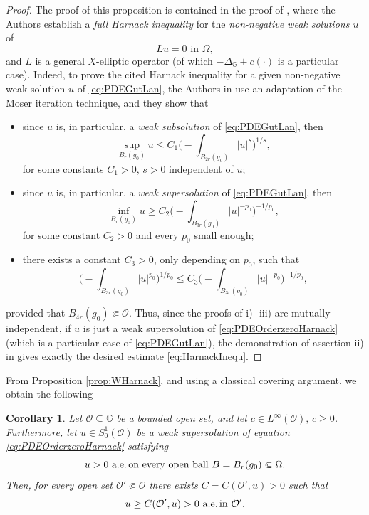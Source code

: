 \documentclass[11pt]{amsart}
\numberwithin{equation}{section} %
\newtheorem{coro}[teo]{Corollary}
\theoremstyle{definition}
\def\Oo{\mathcal O}
\begin{document}
\begin{proof}
 The proof of this proposition is contained in the proof of \cite[Theorem 4.1]{GutLan},
 where the Authors establish a \emph{full Harnack inequality}
 for the \emph{non-negative weak solutions $u$} of 
 \begin{equation} \label{eq:PDEGutLan} 
  \text{$Lu = 0$ in $\Omega$},
 \end{equation}
 and $L$ is a general $X$-elliptic operator (of which $-\Delta_\mathbb{G}+c(\cdot)$ is a particular
 case).
 Indeed,
 to prove the cited Harnack inequality for a given non-negative weak solution $u$
 of \eqref{eq:PDEGutLan}, the Authors in \cite{GutLan} use
 an adaptation of the Moser iteration technique, and they show that
 \begin{itemize}
  \item[i)] since $u$ is, in particular, a \emph{weak subsolution} of \eqref{eq:PDEGutLan}, then
  $$\sup_{B_r(g_0)}u \leq C_1\Big(-\!\!\!\!\!\!\!\int_{B_{2r}(g_0)}|u|^{s}\Big)^{1/s},$$
  for some constants $C_1 > 0,\,s > 0$ independent of $u$;
  \vspace*{0.05cm}
  
  \item[ii)] since $u$ is, in particular, a \emph{weak supersolution} of \eqref{eq:PDEGutLan}, then
  $$\inf_{B_r(g_0)}u \geq C_2\Big(-\!\!\!\!\!\!\!\int_{B_{3r}(g_0)}|u|^{-p_0}\Big)^{-1/p_0},$$
  for some constant $C_2 > 0$ and every $p_0$ small enough;
  \vspace*{0.05cm}
  
  \item[iii)] there exists a constant $C_3 > 0$, only depending on $p_0$, such that
  $$\Big(-\!\!\!\!\!\!\!\int_{B_{3r}(g_0)}|u|^{p_0}\Big)^{1/p_0}
  \leq C_3\Big(-\!\!\!\!\!\!\!\int_{B_{3r}(g_0)}|u|^{-p_0}\Big)^{-1/p_0},$$
 \end{itemize}
 provided that $B_{4r}(g_0)\Subset\mathcal{O}$. Thus, since the proofs of i)\,-\,iii) are mutually independent,
 if $u$ is just a weak supersolution of \eqref{eq:PDEOrderzeroHarnack} (which is a particular
 case of \eqref{eq:PDEGutLan}), the demonstration of assertion ii)
 in \cite{GutLan} gives exactly the desired estimate \eqref{eq:HarnackInequ}.
\end{proof}
From Proposition \ref{prop:WHarnack}, and using a classical covering argument, we obtain the following
\begin{coro} \label{cor:BrezisNirenbergpernoi}
 Let $\mathcal{O}\subseteq\mathbb{G}$ be a bounded open set,
 and let $c\in L^\infty(\mathcal{O}),\,\text{$c\geq 0$}$. Furthermore, let
 $u\in S_0^1(\mathcal{O})$ be a weak superso\-lu\-tion of 
equation \eqref{eq:PDEOrderzeroHarnack} satisfying
$$\text{$u > 0$ a.e.\,on every open ball $B = B_r(g_0)\Subset\Omega$}.$$
Then, for every open set $\mathcal{O}'\Subset\mathcal{O}$ there exists $C = C(\Oo',u) > 0$ such that
$$\text{$u\geq C(\Oo',u) > 0$ a.e.\,in $\Oo'$}.$$
\end{coro}
\end{document}
